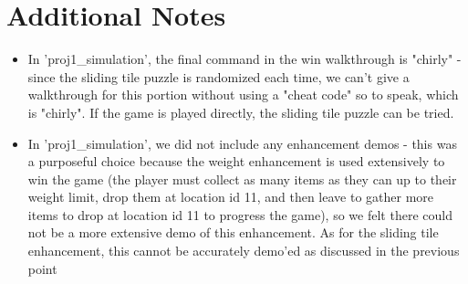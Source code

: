 \documentclass[11pt]{article}
\begin{document}
\section*{Additional Notes}
\begin{itemize}
    \item In 'proj1\_simulation', the final command in the win walkthrough is "chirly" - since the sliding tile puzzle is randomized each time, we can't give a walkthrough for this portion without using a "cheat code" so to speak, which is "chirly". If the game is played directly, the sliding tile puzzle can be tried.
    \item In 'proj1\_simulation', we did not include any enhancement demos - this was a purposeful choice because the weight enhancement is used extensively to win the game (the player must collect as many items as they can up to their weight limit, drop them at location id 11, and then leave to gather more items to drop at location id 11 to progress the game), so we felt there could not be a more extensive demo of this enhancement. As for the sliding tile enhancement, this cannot be accurately demo'ed as discussed in the previous point
\end{itemize}
\end{document}

